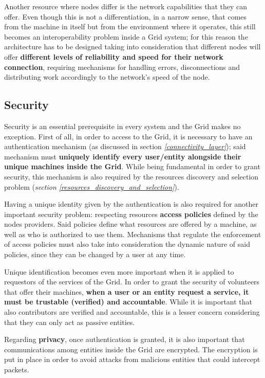 Another resource where nodes differ is the network capabilities that they can offer. Even though this is not a differentiation, in a narrow sense, that comes from the machine in itself but from the environment where it operates, this still becomes an interoperability problem inside a Grid system; for this reason the architecture has to be designed taking into consideration that different nodes will offer \textbf{different levels of reliability and speed for their network connection}, requiring mechanisms for handling errors, disconnections and distributing work accordingly to the network's speed of the node. 

\subsection{Security}\label{security}
Security is an essential prerequisite in every system and the Grid makes no exception. First of all, in order to access to the Grid, it is necessary to have an authentication mechanism (as discussed in section \textit{\ref{connectivity_layer}}); said mechanism must \textbf{uniquely identify every user/entity alongside their unique machines inside the Grid}. While being fundamental in order to grant security, this mechanism is also required by the resources discovery and selection problem (\textit{section \ref{resources_discovery_and_selection}}).

Having a unique identity given by the authentication is also required for another important security problem: respecting resources \textbf{access policies} defined by the nodes providers. Said policies define what resources are offered by a machine, as well as who is authorized to use them. Mechanisms that regulate the enforcement of access policies must also take into consideration the dynamic nature of said policies, since they can be changed by a user at any time.

Unique identification becomes even more important when it is applied to requestors of the services of the Grid. In order to grant the security of volunteers that offer their machines, \textbf{when a user or an entity request a service, it must be trustable (verified) and accountable}. While it is important that also contributors are verified and accountable, this is a lesser concern considering that they can only act as passive entities.

Regarding \textbf{privacy}, once authentication is granted, it is also important that communications among entities inside the Grid are encrypted. The encryption is put in place in order to avoid attacks from malicious entities that could intercept packets.

